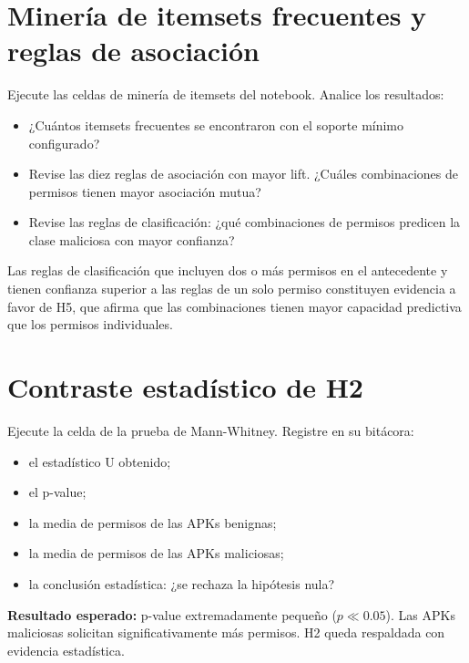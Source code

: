 \documentclass[
  coursetitle={Cómputo Nube y Tecnologías Emergentes},
  coursehours={96},
  coursedate={Verano 2026},
  doctype={Taller},
  otherlangs={english,french},
  authorname={Lázaro},
  authorsurname={Bustio-Martínez},
  authortitle={PhD},
  role={Profesor Investigador},
  email={lbustio@inaoe.mx},
  phone={5559504000},
  ext={7459},
  institution={Instituto Nacional de Astrofísica, Óptica y Electrónica (INAOE)},
  department={Maestría en Ciencias en Tecnologías de Seguridad},
  address={Luis Enrique Erro 1, Sta. Ma. Tonantzintla, San Andrés Cholula, CP 72840, Puebla, México},
  margin={0.5in}
]{../../lbustio_lecture_notes}
\begin{document}
\section{Minería de itemsets frecuentes y reglas de asociación}

Ejecute las celdas de minería de itemsets del notebook. Analice los resultados:

\begin{itemize}
    \item ¿Cuántos itemsets frecuentes se encontraron con el soporte mínimo configurado?
    \item Revise las diez reglas de asociación con mayor lift. ¿Cuáles combinaciones de permisos tienen mayor asociación mutua?
    \item Revise las reglas de clasificación: ¿qué combinaciones de permisos predicen la clase maliciosa con mayor confianza?
\end{itemize}

\begin{tcolorbox}[title=Evidencia para H5]
Las reglas de clasificación que incluyen dos o más permisos en el antecedente y tienen confianza superior a las reglas de un solo permiso constituyen evidencia a favor de H5, que afirma que las combinaciones tienen mayor capacidad predictiva que los permisos individuales.
\end{tcolorbox}

\section{Contraste estadístico de H2}

Ejecute la celda de la prueba de Mann-Whitney. Registre en su bitácora:

\begin{itemize}
    \item el estadístico U obtenido;
    \item el p-value;
    \item la media de permisos de las APKs benignas;
    \item la media de permisos de las APKs maliciosas;
    \item la conclusión estadística: ¿se rechaza la hipótesis nula?
\end{itemize}

\begin{tcolorbox}[title=Punto de control 1]
\textbf{Resultado esperado:} p-value extremadamente pequeño ($p \ll 0.05$). Las APKs maliciosas solicitan significativamente más permisos. H2 queda respaldada con evidencia estadística.
\end{tcolorbox}
\end{document}
